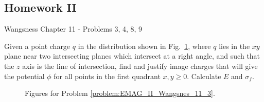 \documentclass[crop=false,class=book,oneside]{standalone}
\begin{document}
        \subsection{Homework II}
            Wangsness Chapter 11 - Problems 3, 4, 8, 9
            \begin{problem}
                \label{problem:EMAG_II_Wangsnes_11_3}
                Given a point charge $q$ in the distribution shown
                in Fig.~\ref{fig:problem:EMAG_II_Wangsnes_11_3}, where
                $q$ lies in the $xy$ plane near two intersecting
                planes which intersect at a right angle, and such that
                the $z$ axis is the line of intersection, find and
                justify image charges that will give the potential
                $\phi$ for all points in the first quadrant
                $x,y\geq{0}$. Calculate $E$ and $\sigma_{f}$.
            \end{problem}
            \begin{solution}
                 
            \end{solution}
            \begin{figure}[H]
                \centering
                \captionsetup{type=figure}
                \begin{subfigure}[b]{0.49\textwidth}
                    \centering
                \end{subfigure}
                \begin{subfigure}[b]{0.49\textwidth}
                    \centering
                \end{subfigure}
                \caption{Figures for Problem
                         \ref{problem:EMAG_II_Wangsnes_11_3}.}
                \label{fig:problem:EMAG_II_Wangsnes_11_3}
            \end{figure}
\end{document}
